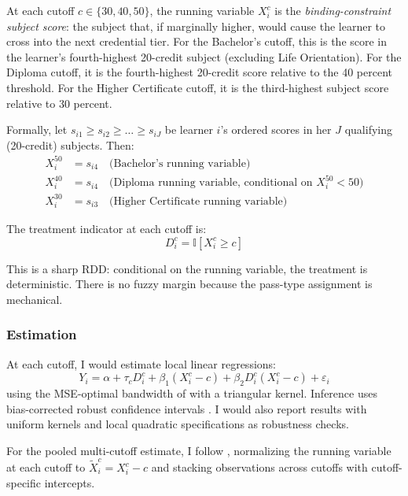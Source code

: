 \documentclass[12pt]{article}
\newcommand{\ind}{\mathbb{I}}
\begin{document}
At each cutoff $c \in \{30, 40, 50\}$, the running variable $X_i^c$ is the \emph{binding-constraint subject score}: the subject that, if marginally higher, would cause the learner to cross into the next credential tier. For the Bachelor's cutoff, this is the score in the learner's fourth-highest 20-credit subject (excluding Life Orientation). For the Diploma cutoff, it is the fourth-highest 20-credit score relative to the 40 percent threshold. For the Higher Certificate cutoff, it is the third-highest subject score relative to 30 percent.

Formally, let $s_{i1} \geq s_{i2} \geq \ldots \geq s_{iJ}$ be learner $i$'s ordered scores in her $J$ qualifying (20-credit) subjects. Then:
\begin{align}
X_i^{50} &= s_{i4} \quad \text{(Bachelor's running variable)} \\
X_i^{40} &= s_{i4} \quad \text{(Diploma running variable, conditional on } X_i^{50} < 50) \\
X_i^{30} &= s_{i3} \quad \text{(Higher Certificate running variable)}
\end{align}

The treatment indicator at each cutoff is:
\begin{equation}
D_i^c = \ind[X_i^c \geq c]
\end{equation}

This is a sharp RDD: conditional on the running variable, the treatment is deterministic. There is no fuzzy margin because the pass-type assignment is mechanical.

\subsubsection{Estimation}

At each cutoff, I would estimate local linear regressions:
\begin{equation}
Y_i = \alpha + \tau_c D_i^c + \beta_1 (X_i^c - c) + \beta_2 D_i^c (X_i^c - c) + \varepsilon_i
\label{eq:locallinear}
\end{equation}
using the MSE-optimal bandwidth of \citet{calonico2014robust} with a triangular kernel. Inference uses bias-corrected robust confidence intervals \citep{calonico2020optimal}. I would also report results with uniform kernels and local quadratic specifications as robustness checks.

For the pooled multi-cutoff estimate, I follow \citet{cattaneo2020multi}, normalizing the running variable at each cutoff to $\tilde{X}_i^c = X_i^c - c$ and stacking observations across cutoffs with cutoff-specific intercepts.
\end{document}
